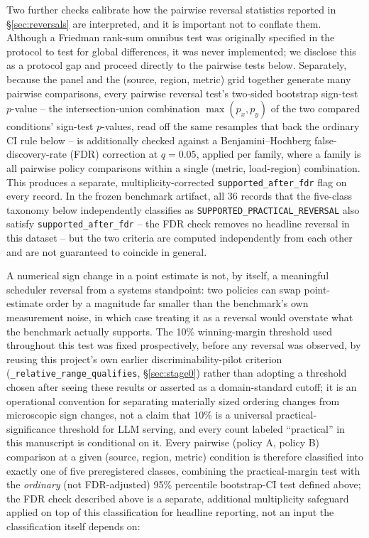 Two further checks calibrate how the pairwise reversal statistics reported
in \S\ref{sec:reversals} are interpreted, and it is important not to
conflate them. Although a Friedman rank-sum omnibus test was originally
specified in the protocol to test for global differences, it was never
implemented; we disclose this as a protocol gap and proceed directly to
the pairwise tests below.
Separately, because the panel and the (source, region, metric) grid
together generate many pairwise comparisons, every pairwise reversal
test's two-sided bootstrap sign-test $p$-value -- the intersection-union
combination $\max(p_x, p_y)$ of the two compared conditions' sign-test
$p$-values, read off the same resamples that back the ordinary CI rule
below -- is additionally checked against a Benjamini--Hochberg
false-discovery-rate (FDR) correction at $q = 0.05$, applied per family, where a
family is all pairwise policy comparisons within a single (metric,
load-region) combination. This produces a separate, multiplicity-corrected
\texttt{supported\_after\_fdr} flag on every record. In the frozen
benchmark artifact, all $36$ records that the five-class taxonomy below
independently classifies as \texttt{SUPPORTED\_PRACTICAL\_REVERSAL} also
satisfy \texttt{supported\_after\_fdr} -- the FDR check removes no headline
reversal in this dataset -- but the two criteria are computed
independently from each other and are not guaranteed to coincide in
general.

A numerical sign change in a point estimate is not, by itself, a meaningful
scheduler reversal from a systems standpoint: two policies can swap
point-estimate order by a magnitude far smaller than the benchmark's own
measurement noise, in which case treating it as a reversal would overstate
what the benchmark actually supports. The 10\% winning-margin threshold
used throughout this test was fixed prospectively, before any
reversal was observed, by reusing this project's own earlier
discriminability-pilot criterion (\texttt{\_relative\_range\_qualifies},
\S\ref{sec:stage0}) rather than adopting a threshold chosen after seeing
these results or asserted as a domain-standard cutoff; it is an
operational convention for separating materially sized ordering changes
from microscopic sign changes, not a claim that 10\% is a universal
practical-significance threshold for LLM serving, and every count labeled
``practical'' in this manuscript is conditional on it. Every pairwise (policy A, policy B)
comparison at a given (source, region, metric) condition is therefore
classified into exactly one of five preregistered classes, combining the
practical-margin test with the \emph{ordinary} (not FDR-adjusted) 95\%
percentile bootstrap-CI test defined above; the
FDR check described above is a separate, additional multiplicity
safeguard applied on top of this classification for headline reporting,
not an input the classification itself depends on:

